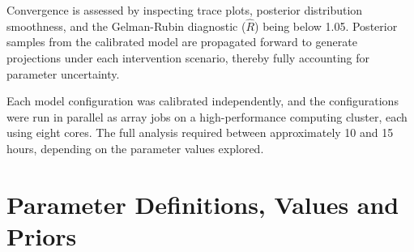 \documentclass[11pt]{article}
\begin{document}
Convergence is assessed by inspecting trace plots, posterior distribution smoothness, and the Gelman-Rubin diagnostic (\(\hat{R}\)) being below 1.05. Posterior samples from the calibrated model are propagated forward to generate projections under each intervention scenario, thereby fully accounting for parameter uncertainty.

Each model configuration was calibrated independently, and the configurations were run in parallel as array jobs on a high-performance computing cluster, each using eight cores. The full analysis required between approximately 10 and 15 hours, depending on the parameter values explored.

\section{Parameter Definitions, Values and Priors}
\label{sec:params}



\clearpage
\normalsize
{}
\printbibliography[title=References]
\end{document}
